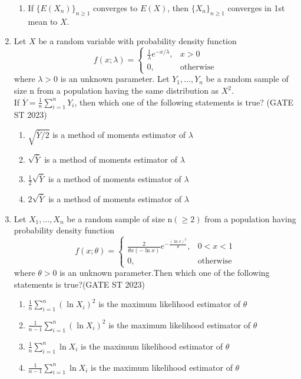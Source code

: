 \documentclass[journal]{IEEEtran}
\begin{document}
\begin{enumerate}[label=\textbf{Q.\arabic*.}, start=11, align=left, itemsep=2em]
\begin{enumerate}
    \item If $\{E(X_n)\}_{n \geq 1}$ converges to $E(X)$, then $\{X_n\}_{n \geq 1}$ converges in 1st mean to $X$.
\end{enumerate}

\item Let $X$ be a random variable with probability density function
\[ f(x;\lambda) = \begin{cases}
\frac{1}{\lambda} e^{-x/\lambda}, & x>0 \\
0, & \text{otherwise}
\end{cases} \]
where $\lambda > 0$ is an unknown parameter. Let $Y_1,\dots,Y_n$ be a random sample of size n from a population having the same distribution as $X^2$.\\
If $\overline{Y} = \frac1n \sum_{i=1}^n Y_i$, then which one of the following statements is true?  \hfill(GATE ST 2023)
\begin{enumerate}
    \item $\sqrt{\overline{Y}/2}$ is a method of moments estimator of $\lambda$
    \item $\sqrt{\overline{Y}}$ is a method of moments estimator of $\lambda$
    \item $\frac{1}{2}\sqrt{\overline{Y}}$ is a method of moments estimator of $\lambda$
    \item $2\sqrt{\overline{Y}}$ is a method of moments estimator of $\lambda$
\end{enumerate}

\item Let $X_1,\dots,X_n$ be a random sample of size n$(\geq 2)$ from a population having probability density function
\[ f(x;\theta) = \begin{cases}
\frac{2}{\theta x (-\ln x)} e^{ - \frac{(\ln x)^2}{\theta}}, & 0 < x < 1 \\
0, & \text{otherwise}
\end{cases} \]
where $\theta >0$ is an unknown parameter.Then which one of the following statements is true?\hfill(GATE ST 2023)  
\begin{enumerate}
    \item $\frac{1}{n} \sum_{i=1}^n (\ln X_i)^2$ is the maximum likelihood estimator of $\theta$  
    \item $\frac{1}{n-1} \sum_{i=1}^n (\ln X_i)^2$ is the maximum likelihood estimator of $\theta$   
    \item $\frac{1}{n} \sum_{i=1}^n \ln X_i$ is the maximum likelihood estimator of $\theta$    
    \item $\frac{1}{n-1} \sum_{i=1}^n \ln X_i$ is the maximum likelihood estimator of $\theta$   
\end{enumerate}


\end{enumerate}
\end{document}
